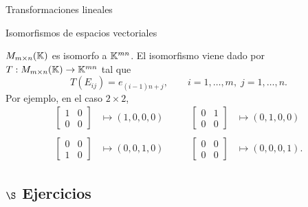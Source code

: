 \begin{chapter}{Transformaciones lineales}
\begin{section}{Isomorfismos de espacios vectoriales}
    \begin{ejemplo*} $M_{m \times n}(\mathbb K)$  es isomorfo a $\mathbb K^{mn}$. El isomorfismo viene dado por $T: M_{m \times n}(\mathbb K) \to \mathbb K^{mn}$ tal que
        $$
        T(E_{ij}) = e_{(i-1)n+j}, \qquad i=1,\ldots, m,\; j=1,\ldots, n.
        $$
    Por  ejemplo, en el caso  $2 \times 2$,
    \begin{equation*}
    \begin{array}{llll}
    \begin{bmatrix} 1&0\\0&0\end{bmatrix} &\mapsto (1,0,0,0) \qquad&
    \begin{bmatrix} 0&1\\0&0\end{bmatrix} &\mapsto (0,1,0,0) \\
    &&&\\
    \begin{bmatrix} 0&0\\1&0\end{bmatrix} &\mapsto (0,0,1,0) &
    \begin{bmatrix} 0&0\\0&0\end{bmatrix} &\mapsto (0,0,0,1).
    \end{array}
    \end{equation*}	 
        
    \end{ejemplo*}
    
    \subsection*{$\S$ Ejercicios}


\end{section}
\end{chapter}
